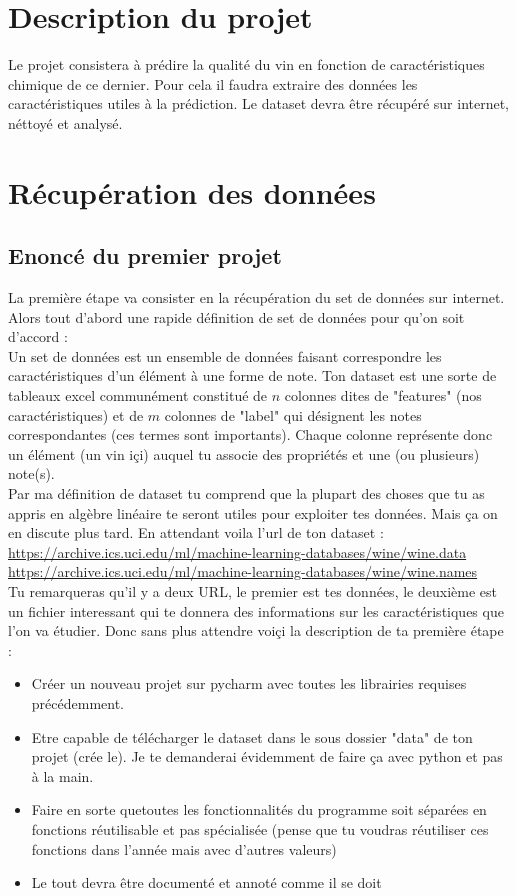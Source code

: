 \documentclass[10pt,a4paper]{book}
\begin{document}
\section{Description du projet}

Le projet consistera à prédire la qualité du vin en fonction de caractéristiques chimique de ce dernier. Pour cela il faudra extraire des données les caractéristiques utiles à la prédiction.
Le dataset devra être récupéré sur internet, néttoyé et analysé.

\section{Récupération des données}

\subsection{Enoncé du premier projet}
La première étape va consister en la récupération du set de données sur internet. Alors tout d'abord une rapide définition de set de données pour qu'on soit d'accord :
\\
Un set de données est un ensemble de données faisant correspondre les caractéristiques d'un élément à une forme de note. Ton dataset est une sorte de tableaux excel communément constitué de $n$ colonnes dites de "features" (nos caractéristiques) et de $m$ colonnes de "label" qui désignent les notes correspondantes (ces termes sont importants). Chaque colonne représente donc un élément (un vin içi) auquel tu associe des propriétés et une (ou plusieurs) note(s).
\\
Par ma définition de dataset tu comprend que la plupart des choses que tu as appris en algèbre linéaire te seront utiles pour exploiter tes données. Mais ça on en discute plus tard.
En attendant voila l'url de ton dataset :
\\
\url{https://archive.ics.uci.edu/ml/machine-learning-databases/wine/wine.data}
\url{https://archive.ics.uci.edu/ml/machine-learning-databases/wine/wine.names}
\\
Tu remarqueras qu'il y a deux URL, le premier est tes données, le deuxième est un fichier interessant qui te donnera des informations sur les caractéristiques que l'on va étudier.
Donc sans plus attendre voiçi la description de ta première étape :
\\

\begin{itemize}

\item Créer un nouveau projet sur pycharm avec toutes les librairies requises précédemment.
\item Etre capable de télécharger le dataset dans le sous dossier "data" de ton projet (crée le). Je te demanderai évidemment de faire ça avec python et pas à la main.
\item Faire en sorte quetoutes les fonctionnalités du programme soit séparées en fonctions réutilisable et pas spécialisée (pense que tu voudras réutiliser ces fonctions dans l'année mais avec d'autres valeurs)
\item Le tout devra être documenté et annoté comme il se doit
\end{itemize}
\end{document}
